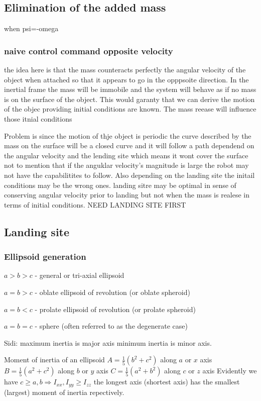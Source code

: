 \subsection{Elimination of the added mass}
\label{Elimination of the added mass}
when psi=-omega
\subsubsection{naive control command opposite velocity}
\label{opposite velocity}
the idea here is that the mass counteracts perfectly the angular velocity of the object when attached so that it appears to go in the opppsoite direction. In the inertial frame the mass will be immobile and the system will behave as if no mass is on the surface of the object. This would garanty that we can derive the motion of the objec providing initial conditions are known. The mass reease will influence those itnial conditions

Problem is since the motion of thje object is periodic the curve described by the mass on the surface will be a closed curve and it will follow a path dependend on the angular velocity and the lending site which means it wont cover the surface not to mention that if the anguklar velocity's magnitude is large the robot may not have the capabilitites to follow. Also depending on the landing site the initail conditions may be the wrong ones. landing sitre may be optimal in sense of conserving angular velocity prior to landing but not when the mass is realese in terms of initial conditions. NEED LANDING SITE FIRST

\subsection{Landing site}
\label{Landing site}
\subsubsection{Ellipsoid generation}

$a > b > c$ - general or tri-axial ellipsoid

$a = b > c$ - oblate ellipsoid of revolution (or oblate spheroid)

$a = b < c$ - prolate ellipsoid of revolution (or prolate spheroid)

$a = b = c$ - sphere (often referred to as the degenerate case)

Sidi: maximum inertia is major axis minimum inertia is minor axis.

Moment of inertia of an ellipsoid
$A=\frac{1}{5}(b^2+c^2)$ along $a$ or $x$ axis
$B=\frac{1}{5}(a^2+c^2)$ along $b$ or $y$ axis
$C=\frac{1}{5}(a^2+b^2)$ along $c$ or $z$ axis
Evidently we have
$c \geq a,b \Rightarrow I_{xx}, I_{yy} \geq I_{zz}$ the longest axis (shortest axis) has the smallest (largest) moment of inertia repectively.




